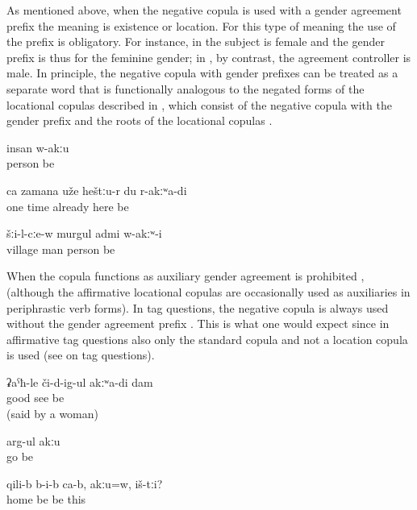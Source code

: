 As mentioned above, when the negative copula is used with a gender agreement prefix the meaning is existence or location. For this type of meaning the use of the prefix is obligatory. For instance, in  the subject is female and the gender prefix is thus for the feminine gender; in , by contrast, the agreement controller is male. In principle, the negative copula with gender prefixes can be treated as a separate word that is functionally analogous to the negated forms of the locational copulas described in , which consist of the negative copula with the gender prefix and the roots of the locational copulas .
%
\begin{exe}
	\ex	\label{ex:Nobody is there}
	\gll	insan	w-akːu\\
		person	be\\
	\glt	{}

	\ex	\label{ex:At one time I was already not there anymore}
	\gll	ca	zamana	uže	heštːu-r	du	r-akːʷa-di\\
		one	time	already	here		be\\
	\glt	{}

	\ex	\label{ex:In the village there was no man}
	\gll	šːi-l-cːe-w	murgul	admi	w-akːʷ-i\\
		village	man	person	be\\
	\glt	{}
\end{exe}

When the copula functions as auxiliary gender agreement is prohibited ,  (although the affirmative locational copulas are occasionally used as auxiliaries in periphrastic verb forms). In tag questions, the negative copula is always used without the gender agreement prefix . This is what one would expect since in affirmative tag questions also only the standard copula and not a location copula is used (see  on tag questions).
%
\begin{exe}
	\ex	\label{ex:I do not see well}
	\gll	ʡaˁħ-le	či-d-ig-ul	akːʷa-di	dam\\
		good	see	be	\\
	\glt	{} (said by a woman)

	\ex	\label{ex:He is not going (with his friends)}
	\gll	arg-ul	akːu\\
		go	be\\
	\glt	{}

	\ex	\label{ex:They are inside the house, aren't they}
	\gll	qili-b	b-i-b	ca-b,	akːu=w,	iš-tːi?\\
		home		be	be	this\\
	\glt	{}
\end{exe}

